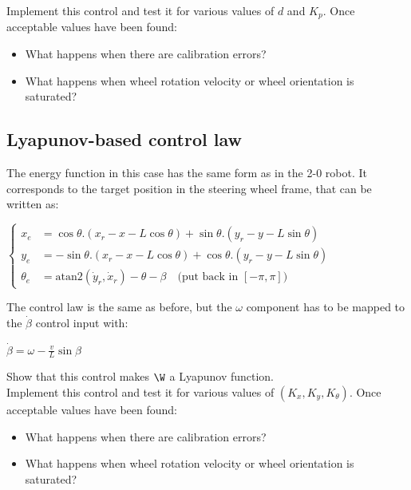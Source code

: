 \documentclass{ecnreport}
\begin{document}
Implement this control and test it for various values of $d$ and $K_p$. Once acceptable values have been found:
\begin{itemize}
 \item What happens when there are calibration errors?
 \item What happens when wheel rotation velocity or wheel orientation is saturated?
\end{itemize} 

\subsection{Lyapunov-based control law}

The energy function in this case has the same form as in the 2-0 robot. It corresponds to the target position in the steering wheel frame, that can be written as:
\begin{center}
 $\left\{\begin{array}{ll}
  x_e &= \cos\theta.(x_r-x-L\cos\theta) + \sin\theta.(y_r-y-L\sin\theta) \\
  y_e &= -\sin\theta.(x_r-x-L\cos\theta) + \cos\theta.(y_r-y-L\sin\theta) \\
  \theta_e &= \text{atan2}(\dot y_r, \dot x_r) - \theta - \beta \quad  \text{(put back in } [-\pi, \pi]\text{)}
\end{array}\right.$
\end{center}
The control law is the same as before, but the $\omega$ component has to be mapped to the $\dot\beta$ control input with:
\begin{center}
 $\displaystyle \dot\beta = \omega - \frac{v}{L}\sin\beta$
\end{center}
Show that this control makes $\W$ a Lyapunov function.\\

Implement this control and test it for various values of $(K_x, K_y, K_\theta)$. Once acceptable values have been found:
\begin{itemize}
 \item What happens when there are calibration errors?
 \item What happens when wheel rotation velocity or wheel orientation is saturated?
\end{itemize} 
\end{document}
